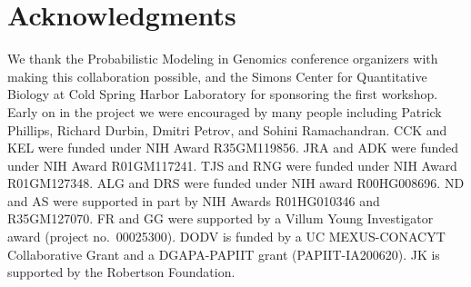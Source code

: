 \documentclass[12pt,halfline,a4paper]{ouparticle}
\begin{document}

\section*{Acknowledgments}
We thank the Probabilistic Modeling in Genomics conference organizers with making this collaboration possible,
and the Simons Center for Quantitative Biology at Cold Spring Harbor Laboratory 
for sponsoring the first workshop.
Early on in the project we were encouraged by many people including Patrick Phillips, Richard Durbin,
Dmitri Petrov, and Sohini Ramachandran.
CCK and KEL were funded under NIH Award R35GM119856.
JRA and ADK were funded under NIH Award R01GM117241.
TJS and RNG were funded under NIH Award R01GM127348.
ALG and DRS were funded under NIH award R00HG008696.
ND and AS were supported in part by NIH Awards R01HG010346 and R35GM127070.
FR and GG were supported by a Villum Young Investigator award (project no.~00025300).
DODV is funded by a UC MEXUS-CONACYT Collaborative Grant and a DGAPA-PAPIIT grant (PAPIIT-IA200620).
JK is supported by the Robertson Foundation.
\end{document}
